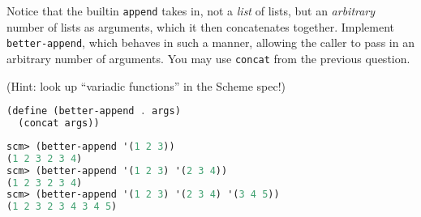 \question Notice that the builtin \texttt{append} takes in, not a \emph{list} of lists, but an \emph{arbitrary}
number of lists as arguments, which it then concatenates together. Implement \texttt{better-append}, which behaves in such
a manner, allowing the caller to pass in an arbitrary number of arguments. You may use \texttt{concat} from the previous
question.

(Hint: look up ``variadic functions'' in the Scheme spec!)

\begin{solution}[1.5in]
\begin{lstlisting}[language=Scheme]
(define (better-append . args)
  (concat args))
\end{lstlisting}
\end{solution}
\begin{lstlisting}[language=Scheme]
scm> (better-append '(1 2 3))
(1 2 3 2 3 4)
scm> (better-append '(1 2 3) '(2 3 4))
(1 2 3 2 3 4)
scm> (better-append '(1 2 3) '(2 3 4) '(3 4 5))
(1 2 3 2 3 4 3 4 5)
\end{lstlisting}
